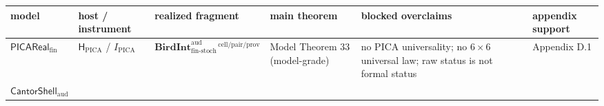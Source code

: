 \documentclass[11pt]{article}
\theoremstyle{definition}
\begin{document}
\begin{longtable}[]{@{}llllll@{}}
\toprule
\begin{minipage}[b]{0.08\columnwidth}\raggedright
model\strut
\end{minipage} & \begin{minipage}[b]{0.12\columnwidth}\raggedright
host / instrument\strut
\end{minipage} & \begin{minipage}[b]{0.22\columnwidth}\raggedright
realized fragment\strut
\end{minipage} & \begin{minipage}[b]{0.12\columnwidth}\raggedright
main theorem\strut
\end{minipage} & \begin{minipage}[b]{0.22\columnwidth}\raggedright
blocked overclaims\strut
\end{minipage} & \begin{minipage}[b]{0.08\columnwidth}\raggedright
appendix support\strut
\end{minipage}\tabularnewline
\midrule
\endhead
\begin{minipage}[t]{0.08\columnwidth}\raggedright
\(\mathsf{PICAReal}_{\mathrm{fin}}\)\strut
\end{minipage} & \begin{minipage}[t]{0.12\columnwidth}\raggedright
\(\mathsf H_{\mathrm{PICA}}\) / \(I_{\mathrm{PICA}}\)\strut
\end{minipage} & \begin{minipage}[t]{0.22\columnwidth}\raggedright
\(\mathbf{BirdInt}^{\mathrm{aud}}_{\mathrm{fin\text{-}stoch}}{}^{\,\mathrm{cell}/\mathrm{pair}/\mathrm{prov}}\)\strut
\end{minipage} & \begin{minipage}[t]{0.12\columnwidth}\raggedright
Model Theorem 33 (model-grade)\strut
\end{minipage} & \begin{minipage}[t]{0.22\columnwidth}\raggedright
no PICA universality; no \(6\times 6\) universal law; raw status is not formal status\strut
\end{minipage} & \begin{minipage}[t]{0.08\columnwidth}\raggedright
Appendix D.1\strut
\end{minipage}\tabularnewline
\begin{minipage}[t]{0.08\columnwidth}\raggedright
\(\mathsf{CantorShell}_{\mathrm{aud}}\)\strut
\end{minipage} & \begin{minipage}[t]{0.12\columnwidth}\raggedright

\end{minipage}
\end{longtable}
\end{document}

